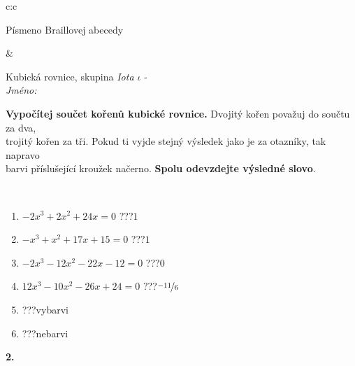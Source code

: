 \documentclass[10pt]{report}
\begin{document}
\begin{tabular}{c:c}
\begin{minipage}[c][104.5mm][t]{0.5\linewidth}
\begin{center}
\begin{minipage}{0.20\linewidth}
\begin{center}
{\small Písmeno Braillovej abecedy}
\end{center}
\end{minipage}
\end{center}
\end{minipage}
&
\begin{minipage}[c][104.5mm][t]{0.5\linewidth}
\begin{center}
\vspace{7mm}
{\huge Kubická rovnice, skupina \textit{Iota $\iota$} -}\\[5mm]
\textit{Jméno:}\phantom{xxxxxxxxxxxxxxxxxxxxxxxxxxxxxxxxxxxxxxxxxxxxxxxxxxxxxxxxxxxxxxxxx}\\[5mm]
\begin{minipage}{0.95\linewidth}
\begin{center}
\textbf{Vypočítej součet kořenů kubické rovnice.} Dvojitý kořen považuj do součtu za dva,\\trojitý kořen za tři. Pokud ti vyjde stejný výsledek jako je za otazníky, tak napravo\\barvi příslušející kroužek načerno. \textbf{Spolu odevzdejte výsledné slovo}.
\end{center}
\end{minipage}
\\[1mm]
\begin{minipage}{0.79\linewidth}
\begin{center}
\begin{varwidth}{\linewidth}
\begin{enumerate}
\Large
\item $-2x^3+2x^2+24x=0$\quad \dotfill\; ???\;\dotfill \quad $1$
\item $-x^3+x^2+17x+15=0$\quad \dotfill\; ???\;\dotfill \quad $1$
\item $-2x^3-12x^2-22x-12=0$\quad \dotfill\; ???\;\dotfill \quad $0$
\item $12x^3-10x^2-26x+24=0$\quad \dotfill\; ???\;\dotfill \quad $\nicefrac{-11}{6}$
\item \quad \dotfill\; ???\;\dotfill \quad vybarvi
\item \quad \dotfill\; ???\;\dotfill \quad nebarvi
\end{enumerate}
\end{varwidth}
\end{center}
\end{minipage}
\begin{minipage}{0.20\linewidth}
\begin{center}
{\Huge\bfseries 2.} \\[2mm]

\end{center}
\end{minipage}
\end{center}
\end{minipage}
\end{tabular}
\end{document}
